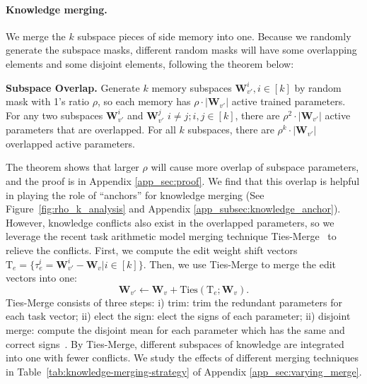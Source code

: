 \paragraph{Knowledge merging.} 
We merge the $k$ subspace pieces of side memory into one. Because we randomly generate the subspace masks, different random masks will have some overlapping elements and some disjoint elements, following the theorem below: 

\begin{theorem}\label{theorem:subspace_overlap}
    \textbf{Subspace Overlap.} 
    Generate $k$ memory subspaces $\mathbf{W}_{v'}^{i}, i \in [k]$ by random mask with 1's ratio $\rho$, so each memory has $\rho\cdot|\mathbf{W}_{v'}|$ active trained parameters. For any two subspaces $\mathbf{W}_{v'}^{i}$ and $\mathbf{W}_{v'}^{j}$ $i\neq j ;i,j \in [k]$, there are $\rho^2\cdot|\mathbf{W}_{v'}|$ active parameters that are overlapped. For all $k$ subspaces, there are $\rho^k\cdot|\mathbf{W}_{v'}|$ overlapped active parameters.
\end{theorem}
The theorem shows that larger $\rho$ will cause more overlap of subspace parameters, and the proof is in Appendix \ref{app_sec:proof}.
We find that this overlap is helpful in playing the role of ``anchors'' for knowledge merging (See Figure~\ref{fig:rho_k_analysis} and Appendix \ref{app_subsec:knowledge_anchor}).
However, knowledge conflicts also exist in the overlapped parameters, so we leverage the recent task arithmetic model merging technique Ties-Merge~\cite{ties_merge} to relieve the conflicts. 
First, we compute the edit weight shift vectors $\mathrm{T}_e =\{ \tau_{e}^{i} = \mathbf{W}_{v'}^{i} - \mathbf{W}_v| i \in [k]\}$. 
Then, we use Ties-Merge to merge the edit vectors into one:
\begin{equation}\label{equ:ties_update}
    \mathbf{W}_{v'} \leftarrow \mathbf{W}_{v} +\text{Ties}(\mathrm{T}_e;\mathbf{W}_{v}).
\end{equation}
Ties-Merge consists of three steps: i) trim: trim the redundant parameters for each task vector; ii) elect the sign: elect the signs of each parameter; ii) disjoint merge: compute the disjoint mean for each parameter which has the same and correct signs~\cite{ties_merge}. 
By Ties-Merge, different subspaces of knowledge are integrated into one with fewer conflicts. 
We study the effects of different merging techniques in Table~\ref{tab:knowledge-merging-strategy} of Appendix \ref{app_sec:varying_merge}.

